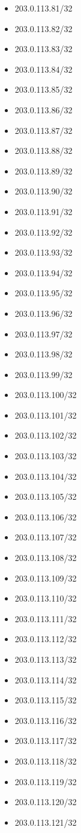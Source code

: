 \documentclass[a4paper,10pt]{article}
\begin{document}
\begin{itemize}
  \item 203.0.113.81/32
  \item 203.0.113.82/32
  \item 203.0.113.83/32
  \item 203.0.113.84/32
  \item 203.0.113.85/32
  \item 203.0.113.86/32
  \item 203.0.113.87/32
  \item 203.0.113.88/32
  \item 203.0.113.89/32
  \item 203.0.113.90/32
  \item 203.0.113.91/32
  \item 203.0.113.92/32
  \item 203.0.113.93/32
  \item 203.0.113.94/32
  \item 203.0.113.95/32
  \item 203.0.113.96/32
  \item 203.0.113.97/32
  \item 203.0.113.98/32
  \item 203.0.113.99/32
  \item 203.0.113.100/32
  \item 203.0.113.101/32
  \item 203.0.113.102/32
  \item 203.0.113.103/32
  \item 203.0.113.104/32
  \item 203.0.113.105/32
  \item 203.0.113.106/32
  \item 203.0.113.107/32
  \item 203.0.113.108/32
  \item 203.0.113.109/32
  \item 203.0.113.110/32
  \item 203.0.113.111/32
  \item 203.0.113.112/32
  \item 203.0.113.113/32
  \item 203.0.113.114/32
  \item 203.0.113.115/32
  \item 203.0.113.116/32
  \item 203.0.113.117/32
  \item 203.0.113.118/32
  \item 203.0.113.119/32
  \item 203.0.113.120/32
  \item 203.0.113.121/32

\end{itemize}
\end{document}
